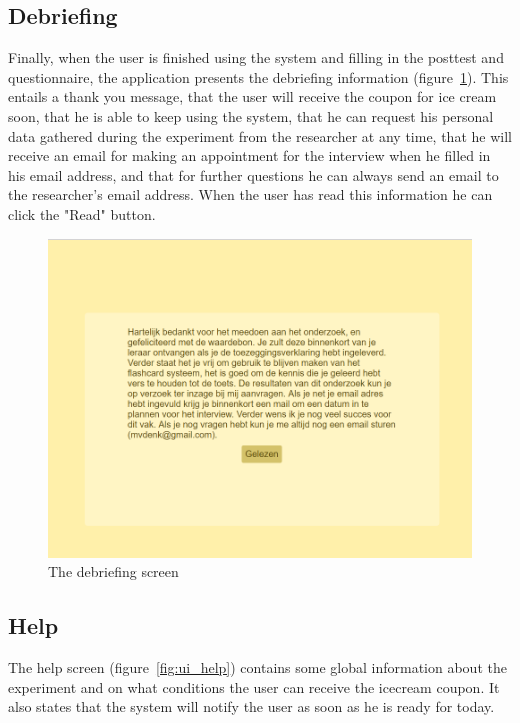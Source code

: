 \subsection{Debriefing}

Finally, when the user is finished using the system and filling in the posttest and questionnaire, the application presents the debriefing information (figure~\ref{fig:ui_debriefing}). This entails a thank you message, that the user will receive the coupon for ice cream soon, that he is able to keep using the system, that he can request his personal data gathered during the experiment from the researcher at any time, that he will receive an email for making an appointment for the interview when he filled in his email address, and that for further questions he can always send an email to the researcher's email address. When the user has read this information he can click the "Read" button.

\begin{figure}
    \centering
    \includegraphics[width=.8\textwidth]{img/ui_debriefing.png}
    \caption{The debriefing screen}
    \label{fig:ui_debriefing}
\end{figure}

\subsection{Help}

The help screen (figure~\ref{fig:ui_help}) contains some global information about the experiment and on what conditions the user can receive the icecream coupon. It also states that the system will notify the user as soon as he is ready for today.

